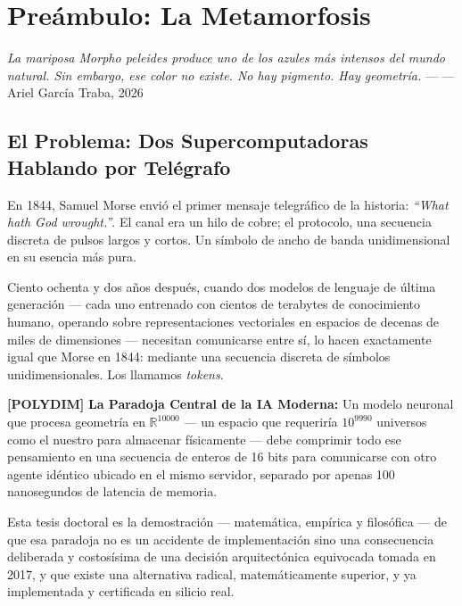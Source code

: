 \chapter{Preámbulo: La Metamorfosis}


\textit{La mariposa \textit{Morpho peleides} produce uno de los azules más
intensos del mundo natural. Sin embargo, ese color no existe.
No hay pigmento. Hay geometría.} --- --- Ariel García Traba, 2026

\section{El Problema: Dos Supercomputadoras Hablando por Telégrafo}

En 1844, Samuel Morse envió el primer mensaje telegráfico de la historia:
\textit{``What hath God wrought.''}. El canal era un hilo de cobre; el protocolo,
una secuencia discreta de pulsos largos y cortos. Un símbolo de ancho de banda
unidimensional en su esencia más pura.

Ciento ochenta y dos años después, cuando dos modelos de lenguaje de última
generación --- cada uno entrenado con cientos de terabytes de conocimiento humano,
operando sobre representaciones vectoriales en espacios de decenas de miles de
dimensiones --- necesitan comunicarse entre sí, lo hacen exactamente igual que
Morse en 1844: mediante una secuencia discreta de símbolos unidimensionales.
Los llamamos \textit{tokens}.

\textbf{[POLYDIM]} 
\textbf{La Paradoja Central de la IA Moderna:} Un modelo neuronal que procesa
geometría en $\mathbb{R}^{10000}$ --- un espacio que requeriría $10^{9990}$ universos
como el nuestro para almacenar físicamente --- debe comprimir todo ese
pensamiento en una secuencia de enteros de 16 bits para comunicarse con otro
agente idéntico ubicado en el mismo servidor, separado por apenas 100 nanosegundos
de latencia de memoria.


Esta tesis doctoral es la demostración --- matemática, empírica y filosófica ---
de que esa paradoja no es un accidente de implementación sino una consecuencia
deliberada y costosísima de una decisión arquitectónica equivocada tomada en 2017,
y que existe una alternativa radical, matemáticamente superior, y ya implementada
y certificada en silicio real.

